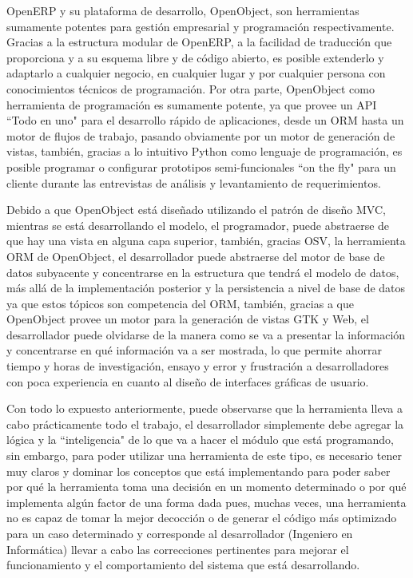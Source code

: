 \documentclass[a4paper, 12pt]{article}
\begin{document}
OpenERP y su plataforma de desarrollo, OpenObject, son herramientas sumamente potentes para gestión empresarial y programación respectivamente. Gracias a la estructura modular de OpenERP, a la facilidad de traducción que proporciona y a su esquema libre y de código abierto, es posible extenderlo y adaptarlo a cualquier negocio, en cualquier lugar y por cualquier persona con conocimientos técnicos de programación. Por otra parte, OpenObject como herramienta de programación es sumamente potente, ya que provee un API ``Todo en uno" para el desarrollo rápido de aplicaciones, desde un ORM hasta un motor de flujos de trabajo, pasando obviamente por un motor de generación de vistas, también, gracias a lo intuitivo Python como lenguaje de programación, es posible programar o configurar prototipos semi-funcionales ``on the fly" para un cliente durante las entrevistas de análisis y levantamiento de requerimientos.

Debido a que OpenObject está diseñado utilizando el patrón de diseño MVC, mientras se está desarrollando el modelo, el programador, puede abstraerse de que hay una vista en alguna capa superior, también, gracias OSV, la herramienta ORM de OpenObject, el desarrollador puede abstraerse del motor de base de datos subyacente y concentrarse en la estructura que tendrá el modelo de datos, más allá de la implementación posterior y la persistencia a nivel de base de datos ya que estos tópicos son competencia del ORM, también, gracias a que OpenObject provee un motor para la generación de vistas GTK y Web, el desarrollador puede olvidarse de la manera como se va a presentar la información y concentrarse en qué información va a ser mostrada, lo que permite ahorrar tiempo y horas de investigación, ensayo y error y frustración a desarrolladores con poca experiencia en cuanto al diseño de interfaces gráficas de usuario.

Con todo lo expuesto anteriormente, puede observarse que la herramienta lleva a cabo prácticamente todo el trabajo, el desarrollador simplemente debe agregar la lógica y la ``inteligencia" de lo que va a hacer el módulo que está programando, sin embargo, para poder utilizar una herramienta de este tipo, es necesario tener muy claros y dominar los conceptos que está implementando para poder saber por qué la herramienta toma una decisión en un momento determinado o por qué implementa algún factor de una forma dada pues, muchas veces, una herramienta no es capaz de tomar la mejor decocción o de generar el código más optimizado para un caso determinado y corresponde al desarrollador (Ingeniero en Informática) llevar a cabo las correcciones pertinentes para mejorar el funcionamiento y el comportamiento del sistema que está desarrollando.
\end{document}
